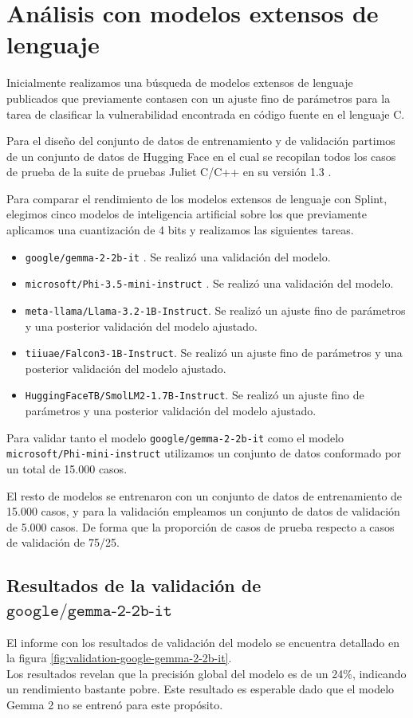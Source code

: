 \documentclass[12pt, a4paper, twoside]{article}
\begin{document}
\section{Análisis con modelos extensos de lenguaje}
Inicialmente realizamos una búsqueda de modelos extensos de lenguaje publicados que previamente contasen con un ajuste fino de parámetros para la tarea de clasificar la vulnerabilidad encontrada en código fuente en el lenguaje C.

Para el diseño del conjunto de datos de entrenamiento y de validación partimos de un conjunto de datos de Hugging Face en el cual se recopilan todos los casos de prueba de la suite de pruebas Juliet C/C++ en su versión 1.3 \cite{lorenzh-juliet}.

Para comparar el rendimiento de los modelos extensos de lenguaje con Splint, elegimos cinco modelos de inteligencia artificial sobre los que previamente aplicamos una cuantización de 4 bits y realizamos las siguientes tareas.

\begin{itemize}
	\item \texttt{google/gemma-2-2b-it} \cite{gemma-team-2024} \cite{gemma-huggingface}. Se realizó una validación del modelo.
	\item \texttt{microsoft/Phi-3.5-mini-instruct} \cite{abdin-2024} \cite{phi-huggingface}. Se realizó una validación del modelo.
	\item \texttt{meta-llama/Llama-3.2-1B-Instruct}. Se realizó un ajuste fino de parámetros y una posterior validación del modelo ajustado.
	\item \texttt{tiiuae/Falcon3-1B-Instruct}. Se realizó un ajuste fino de parámetros y una posterior validación del modelo ajustado.
	\item \texttt{HuggingFaceTB/SmolLM2-1.7B-Instruct}. Se realizó un ajuste fino de parámetros y una posterior validación del modelo ajustado.
\end{itemize}

Para validar tanto el modelo \texttt{google/gemma-2-2b-it} como el modelo \texttt{microsoft/Phi-mini-instruct} utilizamos un conjunto de datos conformado por un total de 15.000 casos.

El resto de modelos se entrenaron con un conjunto de datos de entrenamiento de 15.000 casos, y para la validación empleamos un conjunto de datos de validación de 5.000 casos. De forma que la proporción de casos de prueba respecto a casos de validación de 75/25.

\subsection{Resultados de la validación de $\texttt{google/gemma-2-2b-it}$}
El informe con los resultados de validación del modelo se encuentra detallado en la figura \ref{fig:validation-google-gemma-2-2b-it}. \\
Los resultados revelan que la precisión global del modelo es de un 24\%, indicando un rendimiento bastante pobre. Este resultado es esperable dado que el modelo Gemma 2 no se entrenó para este propósito.
\end{document}
